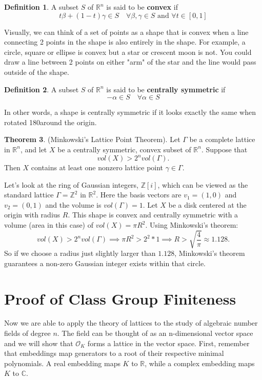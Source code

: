 \documentclass[12pt]{article}
\theoremstyle{definition}
\newtheorem{theorem}{Theorem}[section]
\newtheorem{definition}[theorem]{Definition}
\begin{document}
\begin{definition}
    A subset $S$ of $\mathbb{R}^n$ is said to be \textbf{convex} if 
    \[t\beta + (1-t)\gamma \in S \quad \forall \beta, \gamma \in S \text{ and } \forall t \in [0,1]\]
\end{definition}

Visually, we can think of a set of points as a shape that is convex when a line connecting 2 points in the shape is also entirely in the shape. 
For example, a circle, square or ellipse is convex but a star or crescent moon is not. You could draw a line between 2 points on either "arm" of the
star and the line would pass outside of the shape. 

\begin{definition}
    A subset $S$ of $\mathbb{R}^n$ is said to be \textbf{centrally symmetric} if 
    \[-\alpha \in S \quad \forall \alpha \in S\]
\end{definition}

In other words, a shape is centrally symmetric if it looks exactly the same when rotated 180\textdegree around the origin.

\begin{theorem}{(Minkowski's Lattice Point Theorem\cite{Eullery}).} 
    Let $\Gamma$ be a complete lattice in $\mathbb{R}^n$, and let $X$ be a centrally symmetric,
    convex subset of $\mathbb{R}^n$. Suppose that 
    \[vol(X) > 2^nvol(\Gamma).\]
    Then $X$ contains at least one nonzero lattice point $\gamma \in \Gamma$.
\end{theorem}

Let's look at the ring of Gaussian integers, $\mathbb{Z}[i]$, which can be viewed as the standard lattice $\Gamma = \mathbb{Z}^2$ in $\mathbb{R}^2$.
Here the basis vectors are $v_1=(1,0)$ and $v_2=(0,1)$ and the volume is $vol(\Gamma)=1$. Let $X$ be a disk centered at the origin with radius $R$.
This shape is convex and centrally symmetric with a volume (area in this case) of $vol(X) = {\pi}R^2$. Using Minkowski's theorem:
\[vol(X) > 2^nvol(\Gamma) \implies {\pi}R^2 > 2^2 * 1 \implies R > \sqrt{\frac{4}{\pi}} \approx 1.128.\]
So if we choose a radius just slightly larger than $1.128$, Minkowski's theorem guarantees a non-zero Gaussian integer exists within that circle. 

\section{Proof of Class Group Finiteness}
\label{sec:finiteness}
Now we are able to apply the theory of lattices to the study of algebraic number fields of degree $n$. The field can be thought of as an
n-dimensional vector space and we will show that $\mathcal{O}_K$ forms a lattice in the vector space. First, remember that embeddings map
generators to a root of their respective minimal polynomials. A real embedding maps $K$ to $\mathbb{R}$, while a complex embedding maps $K$ to $\mathbb{C}$.
\end{document}
